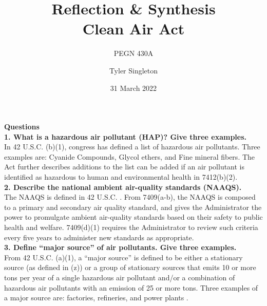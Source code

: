 \documentclass[12pt]{article}
\title{Reflection \& Synthesis \\
Clean Air Act}
\subtitle{PEGN 430A}
\author{Tyler Singleton}
\date{31 March 2022}
\begin{document}
\maketitle

\newpage
\setlength{\parindent}{0pt}

\textbf{Questions} \\

\textbf{1. What is a hazardous air pollutant (HAP)? Give three examples.} \\
In 42 U.S.C. (b)(1), congress has defined a list of hazardous air pollutants. Three examples are: Cyanide Compounds, Glycol ethers, and Fine mineral fibers. The Act further describes additions to the list can be added if an air pollutant is identified as hazardous to human and environmental health in 7412(b)(2). \\

\textbf{2. Describe the national ambient air-quality standards (NAAQS).} \\
The NAAQS is defined in 42 U.S.C. . From 7409(a-b), the NAAQS is composed to a primary and secondary air quality standard, and gives the Administrator the power to promulgate ambient air-quality standards based on their safety to public health and welfare. 7409(d)(1) requires the Administrator to review such criteria every five years to administer new standards as appropriate. \\

\textbf{3. Define ``major source'' of air pollutants.  Give three examples.} \\
From 42 U.S.C. (a)(1), a ``major source'' is defined to be either a stationary source (as defined in (z)) or a group of stationary sources that emits 10 or more tons per year of a single hazardous air pollutant and/or a combination of hazardous air pollutants with an emission of 25 or more tons. Three examples of a major source are: factories, refineries, and power plants \cite{epa}. \\





\newpage
\printbibliography
\end{document}

